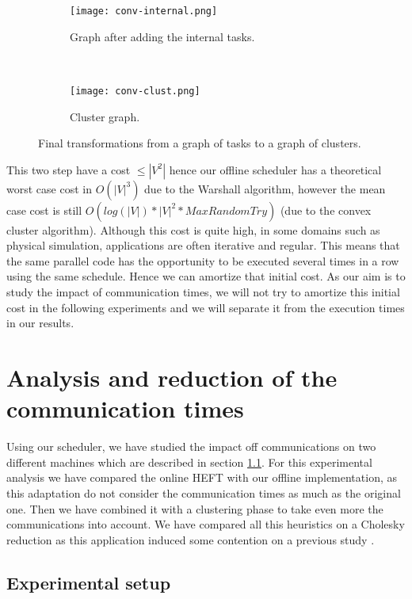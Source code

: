 \documentclass[10pt, conference, compsocconf,pdftex,dvipsnames]{IEEEtran}
\begin{document}
\begin{figure}[t!]
    \centering
    \begin{subfigure}{0.24\textwidth}
        \centering
        \texttt{[image: conv-internal.png]}
        \caption{Graph after adding the internal tasks.}
        \label{fig:conv-int}
    \end{subfigure}
    ~
    \begin{subfigure}{0.1\textwidth}
        \centering
        \texttt{[image: conv-clust.png]}
        \caption{Cluster graph.}
        \label{fig:conv-clust}
    \end{subfigure}
    \caption{Final transformations from a graph of tasks to a graph of
    clusters.}
    \label{fig:conv-end}
\end{figure}

This two step have a cost $\leq |V^2|$ hence our offline scheduler has a
theoretical worst case cost in $O(|V|^3)$ due to the Warshall algorithm,
however the mean case cost is still $O(log(|V|)*|V|^2*MaxRandomTry)$ (due to
the convex cluster algorithm).  Although this cost is quite high, in some
domains such as physical simulation, applications are often
iterative and regular. This means that the same parallel code has the
opportunity to be executed several times in a row using the same schedule.
Hence we can amortize that initial cost. As our aim is to study the impact of
communication times, we will not try to amortize this initial cost in the
following experiments and we will separate it from the execution times in our
results.

\section{Analysis and reduction of the communication times}
\label{sec:exp}
Using our scheduler, we have studied the impact off communications on two
different machines which are described in section \ref{sec:exp-set}. For this
experimental analysis we have compared the online HEFT with our offline
implementation, as this adaptation do not consider the communication times as
much as the original one. Then we have combined it with a clustering phase to
take even more the communications into account. We have compared all this
heuristics on a Cholesky reduction as this application induced some contention
on a previous study \cite{ferreiralima:hal-00735470}.


\subsection{Experimental setup}
\label{sec:exp-set}
\end{document}
